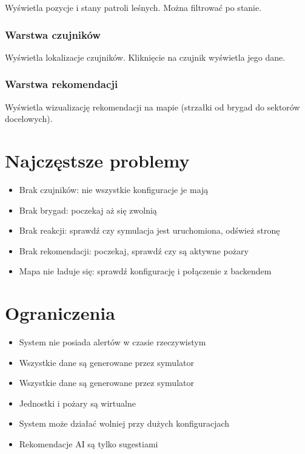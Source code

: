Wyświetla pozycje i stany patroli leśnych. Można filtrować po stanie.

\subsubsection{Warstwa czujników}

Wyświetla lokalizacje czujników. Kliknięcie na czujnik wyświetla jego dane.

\subsubsection{Warstwa rekomendacji}

Wyświetla wizualizację rekomendacji na mapie (strzałki od brygad do sektorów docelowych).

\section{Najczęstsze problemy}

\begin{itemize}
    \item Brak czujników: nie wszystkie konfiguracje je mają
    \item Brak brygad: poczekaj aż się zwolnią
    \item Brak reakcji: sprawdź czy symulacja jest uruchomiona, odśwież stronę
    \item Brak rekomendacji: poczekaj, sprawdź czy są aktywne pożary
    \item Mapa nie ładuje się: sprawdź konfigurację i połączenie z backendem
\end{itemize}

\section{Ograniczenia}

\begin{itemize}
    \item System nie posiada alertów w czasie rzeczywistym
    \item Wszystkie dane są generowane przez symulator
    \item Wszystkie dane są generowane przez symulator
    \item Jednostki i pożary są wirtualne
    \item System może działać wolniej przy dużych konfiguracjach
    \item Rekomendacje AI są tylko sugestiami
\end{itemize}

